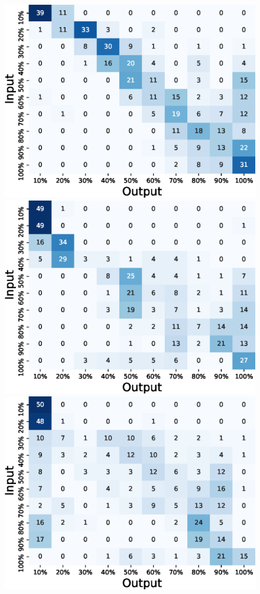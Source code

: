 \documentclass[submit,techrep,noauthor]{ipsj}
\begin{document}
\begin{figure}[!t]
  \begin{minipage}[t]{0.32\linewidth}
    \centering
    \includegraphics[width=0.9\linewidth]{figures/confusion_matrix_10_independent_shampoo.eps}
  \end{minipage}
  \begin{minipage}[t]{0.32\linewidth}
    \centering
    \includegraphics[width=0.9\linewidth]{figures/confusion_matrix_10_independent_skinmilk.eps}
  \end{minipage}
  \begin{minipage}[t]{0.32\linewidth}
    \centering
    \includegraphics[width=0.9\linewidth]{figures/confusion_matrix_10_independent_tokkuri.eps}

\end{minipage}
\end{figure}
\end{document}
